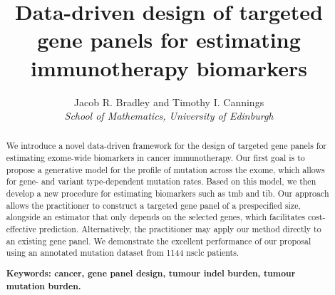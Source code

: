 \documentclass[12pt]{article}
\title{Data-driven design of targeted gene panels for estimating immunotherapy biomarkers}
\author{Jacob R. Bradley and Timothy I. Cannings
 \\ \emph{School of Mathematics, University of Edinburgh}}
\date{}
\begin{document}
\maketitle
\begin{abstract}
We introduce a novel data-driven framework for the design of targeted gene panels for estimating exome-wide biomarkers in cancer immunotherapy. Our first goal is to propose a generative model for the profile of mutation across the exome, which allows for gene- and variant type-dependent mutation rates. Based on this model, we then develop a new procedure for estimating biomarkers such as \acrlong{tmb} and \acrlong{tib}.  Our approach allows the practitioner to construct a targeted gene panel of a prespecified size, alongside an estimator that only depends on the selected genes, which facilitates cost-effective prediction.  Alternatively, the practitioner may apply our method directly to an existing gene panel. We demonstrate the excellent performance of our proposal using an annotated mutation dataset from 1144 \acrlong{nsclc} patients. 




\textbf{Keywords: cancer, gene panel design, tumour indel burden, tumour mutation burden.}
\end{abstract}
\end{document}
